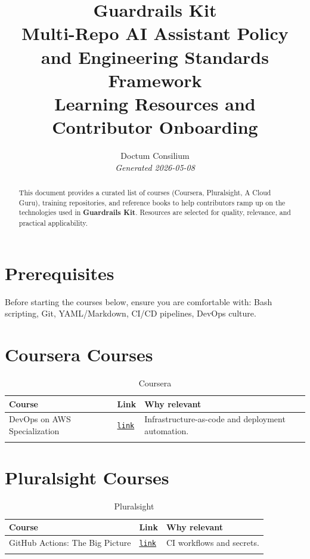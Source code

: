 \documentclass[11pt,a4paper]{article}
\begin{document}
\title{
  \textcolor{doctum}{\Large\textbf{Guardrails Kit}} \\[0.5em]
  \large Multi-Repo AI Assistant Policy and Engineering Standards Framework \\[0.3em]
  \normalsize Learning Resources and Contributor Onboarding
}
\author{Doctum Consilium \\ \small\textit{Generated 2026-05-08}}
\date{}
\maketitle
\thispagestyle{fancy}

\begin{abstract}
This document provides a curated list of courses (Coursera, Pluralsight, A Cloud Guru),
training repositories, and reference books to help contributors ramp up on the
technologies used in \textbf{Guardrails Kit}.
Resources are selected for quality, relevance, and practical applicability.
\end{abstract}

\tableofcontents
\newpage

\section{Prerequisites}
Before starting the courses below, ensure you are comfortable with:
Bash scripting, Git, YAML/Markdown, CI/CD pipelines, DevOps culture.

\section{Coursera Courses}
\begin{longtable}{p{6cm} p{1.5cm} p{7cm}}
\toprule
\textbf{Course} & \textbf{Link} & \textbf{Why relevant} \\
\midrule
\endhead
  DevOps on AWS Specialization & \href{https://www.coursera.org/specializations/aws-devops}{\texttt{link}} & Infrastructure-as-code and deployment automation. \\
\bottomrule
\caption{Coursera}
\end{longtable}


\section{Pluralsight Courses}
\begin{longtable}{p{6cm} p{1.5cm} p{7cm}}
\toprule
\textbf{Course} & \textbf{Link} & \textbf{Why relevant} \\
\midrule
\endhead
  GitHub Actions: The Big Picture & \href{https://www.pluralsight.com/courses/github-actions-big-picture}{\texttt{link}} & CI workflows and secrets. \\
\bottomrule
\caption{Pluralsight}
\end{longtable}
\end{document}

